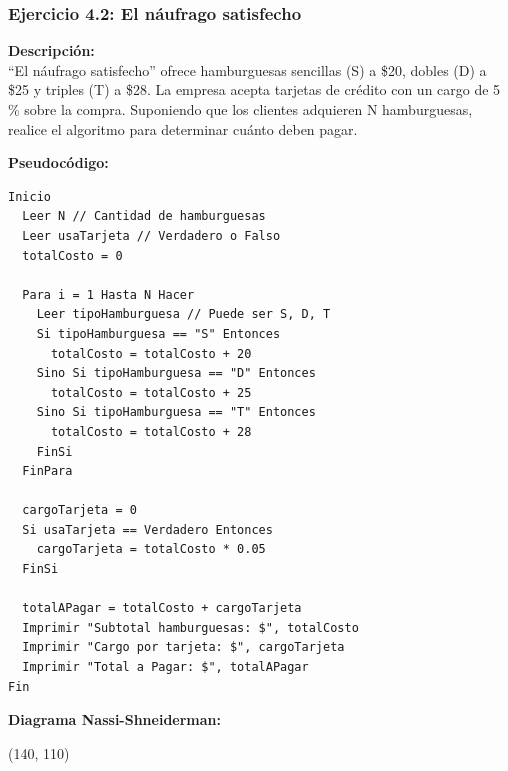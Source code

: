 \documentclass[12pt, a4paper]{article}
\begin{document}
\newpage
\subsubsection{Ejercicio 4.2: El náufrago satisfecho}
\textbf{Descripción:}\\
“El náufrago satisfecho” ofrece hamburguesas sencillas (S) a \$20, dobles (D) a \$25 y triples (T) a \$28. La empresa acepta tarjetas de crédito con un cargo de 5 \% sobre la compra. Suponiendo que los clientes adquieren N hamburguesas, realice el algoritmo para determinar cuánto deben pagar.

\textbf{Pseudocódigo:}
\begin{verbatim}
Inicio
  Leer N // Cantidad de hamburguesas
  Leer usaTarjeta // Verdadero o Falso
  totalCosto = 0
  
  Para i = 1 Hasta N Hacer
    Leer tipoHamburguesa // Puede ser S, D, T
    Si tipoHamburguesa == "S" Entonces
      totalCosto = totalCosto + 20
    Sino Si tipoHamburguesa == "D" Entonces
      totalCosto = totalCosto + 25
    Sino Si tipoHamburguesa == "T" Entonces
      totalCosto = totalCosto + 28
    FinSi
  FinPara
  
  cargoTarjeta = 0
  Si usaTarjeta == Verdadero Entonces
    cargoTarjeta = totalCosto * 0.05
  FinSi
  
  totalAPagar = totalCosto + cargoTarjeta
  Imprimir "Subtotal hamburguesas: $", totalCosto
  Imprimir "Cargo por tarjeta: $", cargoTarjeta
  Imprimir "Total a Pagar: $", totalAPagar
Fin
\end{verbatim}

\textbf{Diagrama Nassi-Shneiderman:}
\vspace{0.5cm}
\begin{center}
\begin{struktogramm}(140, 110)
    \change
      \change
        \change
        \ifend
      \ifend
    \ifend
  \whileend
  \change
  \ifend
\end{struktogramm}
\end{center}
\vspace{2.5cm}
\end{document}
